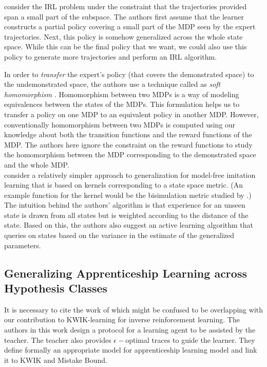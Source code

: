 \citet{DBLP:conf/icra/BoulariasC10} consider the IRL problem under the constraint that the trajectories provided span a small part of the subspace. The authors first assume that the learner constructs a partial policy covering a small part of the MDP seen by the expert trajectories. Next, this policy is somehow generalized across the whole state space. While this can be the final policy that we want, we could also use this policy to generate more trajectories and perform an IRL algorithm. 

In order to \textit{transfer} the expert's policy (that covers the demonstrated space) to the undemonstrated space, the authors use a technique called as \textit{soft homomorphism} \citet{Sorg:2009:TVS:1558109.1558114}. Homomorphism between two MDPs is a way of modeling equivalences between the states of the MDPs. This formulation helps us to transfer a policy on one MDP to an equivalent policy in another MDP. However, conventionally homomorphism between two MDPs is computed using our knowledge about both the transition functions and the reward functions of the MDP. The authors here ignore the constraint on the reward functions to study the homomorphism between the MDP corresponding to the demonstrated space and the whole MDP. \\


\citet{DBLP:conf/pkdd/MeloL10} consider a relatively simpler approach to generalization for model-free imitation learning that is based on kernels corresponding to a state space metric. (An example function for the kernel would be the bisimulation metric studied by \citet{DBLP:journals/corr/abs-1207-4114}.)
The intuition behind the authors' algorithm is that experience for an unseen state is drawn from all states but is weighted according to the distance of the state. Based on this, the
authors also suggest an active learning algorithm that queries on states based on the variance in the estimate of the generalized parameters. 




\subsection{Generalizing Apprenticeship Learning across Hypothesis Classes}
\label{sec:walsh}
It is necessary to cite the work of \citet{DBLP:conf/icml/WalshSLD10} which might be confused to be overlapping with our contribution to KWIK-learning for inverse reinforcement learning. The authors in this work design a protocol for a learning agent to be assisted by the teacher. The teacher also provides $\epsilon-$optimal traces to guide the learner. They define formally an appropriate model for  apprenticeship learning model and link it to KWIK and Mistake Bound. 

